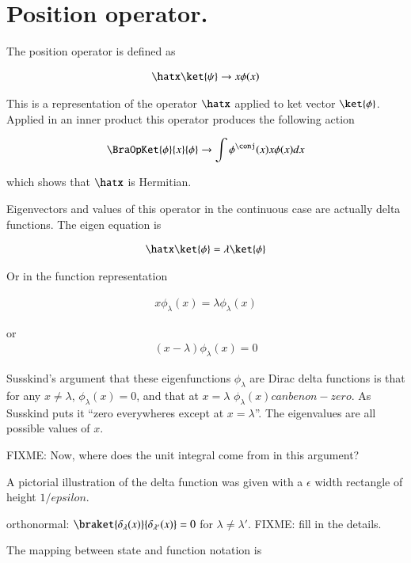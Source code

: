 \section{Position operator. }

The position operator is defined as

\begin{align*}
\hatx \ket{\psi} \rightarrow x \phi(x)
\end{align*}

This is a representation of the operator $\hatx$ applied to ket vector $\ket{\phi}$.  Applied in an inner product this operator produces the
following action

\begin{align*}
\BraOpKet{\phi}{x}{\phi} \rightarrow \int {\phi^\conj}(x) x \phi(x) dx
\end{align*}

which shows that $\hatx$ is Hermitian.

Eigenvectors and values of this operator in the continuous case are actually delta functions.  The eigen equation is

\begin{align*}
\hatx \ket{\phi} = \lambda \ket{\phi}
\end{align*}

Or in the function representation

\begin{align*}
x \phi_{\lambda}(x) = \lambda \phi_{\lambda}(x)
\end{align*}

or
\begin{align*}
(x - \lambda) \phi_{\lambda}(x) = 0
\end{align*}

Susskind's argument that these eigenfunctions $\phi_\lambda$ are Dirac delta functions is that for any $x\ne \lambda$, $\phi_\lambda(x) = 0$, and that at $x = \lambda$ $\phi_\lambda(x) can be non-zero$.  As Susskind puts it ``zero everywheres except at $x = \lambda$''.  The eigenvalues are all possible values of $x$.

FIXME: Now, where does the unit integral come from in this argument?

A pictorial illustration of the delta function was given with a $\epsilon$ width rectangle of height $1/epsilon$.

orthonormal: $\braket {\delta_{\lambda}(x)} {\delta_{\lambda'}(x)} = 0$ for $\lambda \ne \lambda'$.  FIXME: fill in the details.

The mapping between state and function notation is

